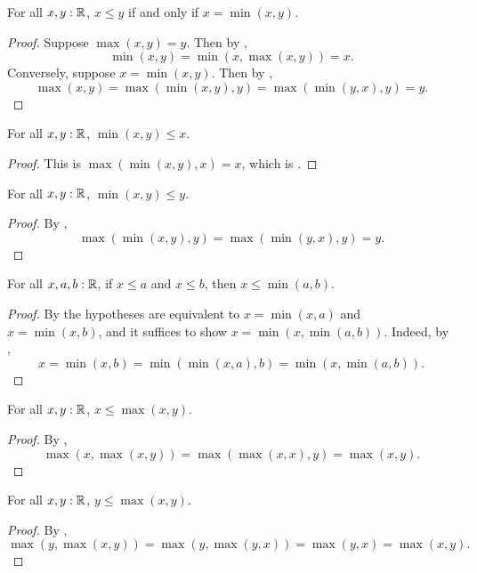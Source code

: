 \begin{lemma}
  \label{leIffMinReal}
  For all $x, y : \mathbb{R}$, $x \le y$ if and only if $x = \min(x, y)$.
\end{lemma}
\begin{proof}
  Suppose $\max(x, y) = y$. Then by ,
  \[
    \min(x, y) = \min(x, \max(x, y)) = x.
  \]
  Conversely, suppose $x = \min(x, y)$. Then by ,
  \[
    \max(x, y) = \max(\min(x, y), y) = \max(\min(y, x), y) = y.
  \]
\end{proof}

\begin{lemma}
  \label{minLeLReal}
  For all $x, y : \mathbb{R}$, $\min(x, y) \le x$.
\end{lemma}
\begin{proof}
  This is $\max(\min(x, y), x) = x$, which is .
\end{proof}

\begin{lemma}
  \label{minLeRReal}
  For all $x, y : \mathbb{R}$, $\min(x, y) \le y$.
\end{lemma}
\begin{proof}
  By ,
  \[
    \max(\min(x, y), y) = \max(\min(y, x), y) = y.
  \]
\end{proof}

\begin{lemma}
  \label{minGLBReal}
  For all $x, a, b : \mathbb{R}$, if $x \le a$ and $x \le b$, then $x \le \min(a, b)$.
\end{lemma}
\begin{proof}
  By  the hypotheses are equivalent to $x = \min(x, a)$ and $x = \min(x, b)$, and it suffices to show $x = \min(x, \min(a, b))$. Indeed, by ,
  \[
    x = \min(x, b) = \min(\min(x, a), b) = \min(x, \min(a, b)).
  \]
\end{proof}

\begin{lemma}
  \label{LLeMaxReal}
  For all $x, y : \mathbb{R}$, $x \le \max(x, y)$.
\end{lemma}
\begin{proof}
  By ,
  \[
    \max(x, \max(x, y)) = \max(\max(x, x), y) = \max(x, y).
  \]
\end{proof}

\begin{lemma}
  \label{RLeMaxReal}
  For all $x, y : \mathbb{R}$, $y \le \max(x, y)$.
\end{lemma}
\begin{proof}
  By ,
  \[
    \max(y, \max(x, y)) = \max(y, \max(y, x)) = \max(y, x) = \max(x, y).
  \]
\end{proof}


